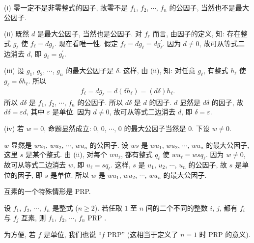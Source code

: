 \begin{pf}
    (i) 零一定不是非零整式的因子, 故零不是 $f_1$, $f_2$, $\cdots$, $f_n$ 的公因子, 当然也不是最大公因子.

    (ii) 既然 $d$ 是最大公因子, 当然也是公因子. 对 $f_{\ell}$ 而言, 由因子的定义, 知: 存在整式 $g_{\ell}$ 使 $f_{\ell} = dg_{\ell}$. 现在看唯一性. 假定 $f_{\ell} = dg_{\ell} = dg_{\ell}^{\prime}$. 因为 $d \neq 0$, 故可从等式二边消去 $d$, 即 $g_{\ell} = g_{\ell}^{\prime}$.

    (iii) 设 $g_1$, $g_2$, $\cdots$, $g_n$ 的最大公因子是 $\delta$. 这样, 由 (ii), 知: 对任意 $g_{\ell}$, 有整式 $h_{\ell}$ 使 $g_{\ell} = \delta h_{\ell}$. 所以
    \begin{align*}
        f_{\ell} = dg_{\ell} = d(\delta h_{\ell}) = (d\delta) h_{\ell}.
    \end{align*}
    所以 $d\delta$ 是 $f_1$, $f_2$, $\cdots$, $f_n$ 的公因子. 所以 $d\delta$ 是 $d$ 的因子. $d$ 显然是 $d\delta$ 的因子, 故 $d\delta = \varepsilon d$, 其中 $\varepsilon$ 是单位. 因为 $d \neq 0$, 故可从等式二边消去 $d$, 即 $\delta = \varepsilon$.

    (iv) 若 $w = 0$, 命题显然成立: $0$, $0$, $\cdots$, $0$ 的最大公因子当然是 $0$. 下设 $w \neq 0$.

    $w$ 显然是 $wu_1$, $wu_2$, $\cdots$, $wu_n$ 的公因子. 设 $ws$ 是 $wu_1$, $wu_2$, $\cdots$, $wu_n$ 的最大公因子, 这里 $s$ 是某个整式. 由 (ii), 对每个 $wu_{\ell}$, 都有整式 $q_{\ell}$ 使 $wu_{\ell} = wsq_{\ell}$. 因为 $w \neq 0$, 故可从等式二边消去 $w$, 即 $u_{\ell} = sq_{\ell}$. 这样, $s$ 是 $u_1$, $u_2$, $\cdots$, $u_n$ 的公因子, 故 $s$ 是单位的因子, 即 $s$ 是单位. 所以 $w$ 是 $wu_1$, $wu_2$, $\cdots$, $wu_n$ 的最大公因子.
\end{pf}

互素的一个特殊情形是 PRP.

\begin{definition}
    设 $f_1$, $f_2$, $\cdots$, $f_n$ 是整式 ($n \geq 2$). 若任取 $1$ 至 $n$ 间的二个不同的整数 $i$, $j$, 都有 $f_i$ 与 $f_j$ 互素, 则 $f_1$, $f_2$, $\cdots$, $f_n$ PRP .

    为方便, 若 $f$ 是单位, 我们也说 ``$f$ PRP'' (这相当于定义了 $n = 1$ 时 PRP 的意义).
\end{definition}


